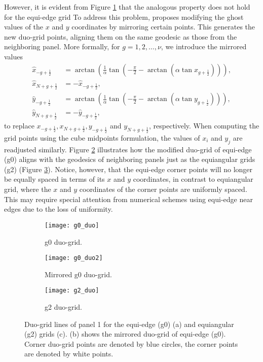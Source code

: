 However, it is evident from Figure \ref{cs-duo-g0} that the analogous property does not hold for the equi-edge grid
To address this problem, \citet{chen:2021} proposes modifying the ghost values of the $x$ and $y$ coordinates by mirroring certain points. 
This generates the new duo-grid points, aligning them on the same geodesic as those from the neighboring panel.
More formally, for $g=1,2,\ldots,\nu$, we introduce the mirrored values
\begin{align}
	\hat{x}_{-g+\frac{1}{2}}  &= \arctan\left(\frac{1}{\alpha}\tan\left(-\frac{\pi}{2}-\arctan{(\alpha \tan{x_{g+\frac{1}{2}} })}\right)\right),\\
	\hat{x}_{N+g+\frac{1}{2}} &= -\hat{x}_{-g+\frac{1}{2}}, \\
	\hat{y}_{-g+\frac{1}{2}}  &= \arctan\left(\frac{1}{\alpha}\tan\left(-\frac{\pi}{2}-\arctan{(\alpha \tan{y_{g+\frac{1}{2}} })}\right)\right),\\
	\hat{y}_{N+g+\frac{1}{2}} &= -\hat{y}_{-g+\frac{1}{2}},
\end{align}
to replace ${x}_{-g+\frac{1}{2}},{x}_{N+g+\frac{1}{2}},{y}_{-g+\frac{1}{2}}$ and ${y}_{N+g+\frac{1}{2}}$, respectively.
When computing the grid points using the cube midpoints formulation, the values of $x_i$ and $y_j$ are readjusted similarly.
Figure \ref{cs-duo-g02} illustrates how the modified duo-grid of equi-edge (g0) aligns with the geodesics of neighboring panels just as the equiangular grids (g2) (Figure \ref{cs-duo-g2}).
Notice, however, that the equi-edge corner points will no longer be equally spaced in terms of its $x$ and $y$ coordinates,
in contrast to equiangular grid, where the $x$ and $y$ coordinates of the corner points are uniformly spaced.
This may require special attention from numerical schemes using equi-edge near edges due to the loss of uniformity.
\begin{figure}[!htb]
	\centering
	\begin{subfigure}{0.45\textwidth}
		\texttt{[image: g0\_duo]}
		\caption{g0 duo-grid.\label{cs-duo-g0}}
	\end{subfigure}
	\begin{subfigure}{0.45\textwidth}
		\centering
		\texttt{[image: g0\_duo2]}
		\caption{Mirrored g0 duo-grid.\label{cs-duo-g02}}
	\end{subfigure}
	\begin{subfigure}{0.45\textwidth}
		\centering
		\texttt{[image: g2\_duo]}
		\caption{g2 duo-grid.\label{cs-duo-g2}}
	\end{subfigure}
	\caption{Duo-grid lines of panel 1 for the equi-edge (g0) (a) and equiangular (g2) grids (c). (b) shows the mirrored duo-grid of equi-edge (g0).
		Corner duo-grid points are denoted by blue circles, the corner points are denoted by white points.\label{cs-duo}}
\end{figure}

